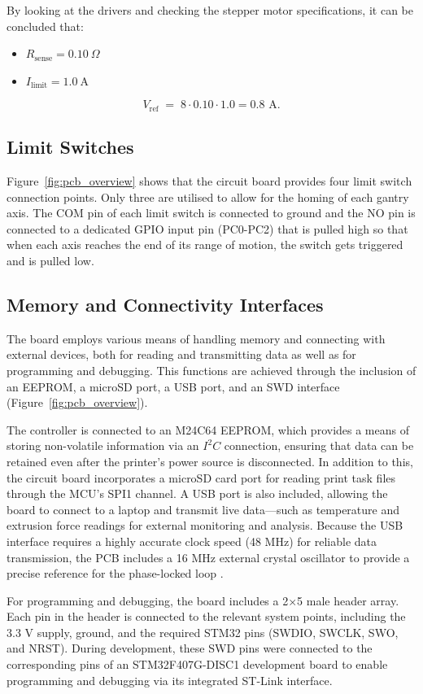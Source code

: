 By looking at the drivers and checking the stepper motor specifications, it can be concluded that:
\begin{itemize}
    \item \(R_{\text{sense}} = 0.10~\Omega\)
    \item \(I_{\text{limit}} = 1.0~\text{A}\)
\end{itemize}

\[V_{\text{ref}} \;=\; 8\cdot 0.10\cdot 1.0=0.8\text{ A.}\]

\subsection{Limit Switches}
Figure~\ref{fig:pcb_overview} shows that the circuit board provides four limit switch connection points. Only three are utilised to allow for the homing of each gantry axis. The COM pin of each limit switch is connected to ground and the NO pin is connected to a dedicated GPIO input pin (PC0-PC2) that is pulled high so that when each axis reaches the end of its range of motion, the switch gets triggered and is pulled low.
\subsection{Memory and Connectivity Interfaces}
The board employs various means of handling memory and connecting with external devices, both for reading and transmitting data as well as for programming and debugging. This functions are achieved through the inclusion of an EEPROM, a microSD port, a USB port, and an SWD interface (Figure~\ref{fig:pcb_overview}).


The controller is connected to an M24C64 EEPROM, which provides a means of storing non-volatile information via an \(I^2C\) connection, ensuring that data can be retained even after the printer’s power source is disconnected. In addition to this, the circuit board incorporates a microSD card port for reading print task files through the MCU’s SPI1 channel. A USB port is also included, allowing the board to connect to a laptop and transmit live data—such as temperature and extrusion force readings for external monitoring and analysis. Because the USB interface requires a highly accurate clock speed (48 MHz) for reliable data transmission, the PCB includes a 16 MHz external crystal oscillator to provide a precise reference for the phase-locked loop \citep{ST_STM32F405F407_datasheet}.

For programming and debugging, the board includes a 2×5 male header array. Each pin in the header is connected to the relevant system points, including the 3.3 V supply, ground, and the required STM32 pins (SWDIO, SWCLK, SWO, and NRST). During development, these SWD pins were connected to the corresponding pins of an STM32F407G-DISC1 development board to enable programming and debugging via its integrated ST-Link interface.

